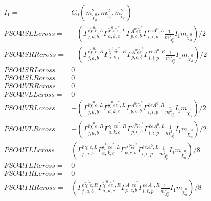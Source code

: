 \documentclass[A4,landscape]{article}
\begin{document}
\begin{align} 
I_1= & C_0(m^2_{\tilde{\chi}^0_{{a}}}, m^2_{\tilde{e}_{{b}}}, m^2_{\tilde{e}_{{c}}}) \\ 
  PSO4lSLLcross= & -( \Gamma^{\bar{e}\tilde{\chi}^0 \tilde{e} ,L}_{j, a, b} \Gamma^{\tilde{\chi}^0 e \tilde{e}^*,L}_{a, k, c} \Gamma^{A^0 \tilde{e} \tilde{e}^*}_{p, c, b} \Gamma^{\bar{e}e A^0 ,L}_{l, i, p} \frac{1}{m^2_{A^0_{{p}}}} I_1 m_{\tilde{\chi}^0_{{a}}})/2 \\ 
  PSO4lSRRcross= & -( \Gamma^{\bar{e}\tilde{\chi}^0 \tilde{e} ,R}_{j, a, b} \Gamma^{\tilde{\chi}^0 e \tilde{e}^*,R}_{a, k, c} \Gamma^{A^0 \tilde{e} \tilde{e}^*}_{p, c, b} \Gamma^{\bar{e}e A^0 ,R}_{l, i, p} \frac{1}{m^2_{A^0_{{p}}}} I_1 m_{\tilde{\chi}^0_{{a}}})/2 \\ 
  PSO4lSRLcross= & 0 \\ 
  PSO4lSLRcross= & 0 \\ 
  PSO4lVRRcross= & 0 \\ 
  PSO4lVLLcross= & 0 \\ 
  PSO4lVRLcross= & -( \Gamma^{\bar{e}\tilde{\chi}^0 \tilde{e} ,L}_{j, a, b} \Gamma^{\tilde{\chi}^0 e \tilde{e}^*,L}_{a, k, c} \Gamma^{A^0 \tilde{e} \tilde{e}^*}_{p, c, b} \Gamma^{\bar{e}e A^0 ,R}_{l, i, p} \frac{1}{m^2_{A^0_{{p}}}} I_1 m_{\tilde{\chi}^0_{{a}}})/2 \\ 
  PSO4lVLRcross= & -( \Gamma^{\bar{e}\tilde{\chi}^0 \tilde{e} ,R}_{j, a, b} \Gamma^{\tilde{\chi}^0 e \tilde{e}^*,R}_{a, k, c} \Gamma^{A^0 \tilde{e} \tilde{e}^*}_{p, c, b} \Gamma^{\bar{e}e A^0 ,L}_{l, i, p} \frac{1}{m^2_{A^0_{{p}}}} I_1 m_{\tilde{\chi}^0_{{a}}})/2 \\ 
  PSO4lTLLcross= & ( \Gamma^{\bar{e}\tilde{\chi}^0 \tilde{e} ,L}_{j, a, b} \Gamma^{\tilde{\chi}^0 e \tilde{e}^*,L}_{a, k, c} \Gamma^{A^0 \tilde{e} \tilde{e}^*}_{p, c, b} \Gamma^{\bar{e}e A^0 ,L}_{l, i, p} \frac{1}{m^2_{A^0_{{p}}}} I_1 m_{\tilde{\chi}^0_{{a}}})/8 \\ 
  PSO4lTLRcross= & 0 \\ 
  PSO4lTRLcross= & 0 \\ 
  PSO4lTRRcross= & ( \Gamma^{\bar{e}\tilde{\chi}^0 \tilde{e} ,R}_{j, a, b} \Gamma^{\tilde{\chi}^0 e \tilde{e}^*,R}_{a, k, c} \Gamma^{A^0 \tilde{e} \tilde{e}^*}_{p, c, b} \Gamma^{\bar{e}e A^0 ,R}_{l, i, p} \frac{1}{m^2_{A^0_{{p}}}} I_1 m_{\tilde{\chi}^0_{{a}}})/8 \\ 
\end{align} 
\end{document}
